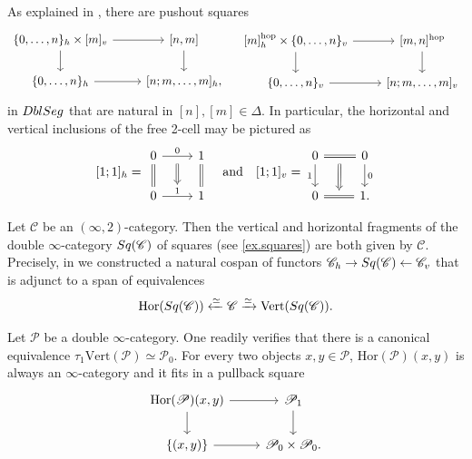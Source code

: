 \documentclass[a4paper, 11pt]{amsart}
\numberwithin{theorem}{section}
\theoremstyle{definition}
\newcommand{\cat}[1]{\textup{#1}}
\newcommand{\C}{\mathscr{C}}
\renewcommand{\P}{\mathscr{P}}
\renewcommand{\Vert}{\mathrm{Vert}}
\newcommand{\Hor}{\mathrm{Hor}}
\newcommand{\DblSeg}{\cat{DblSeg}}
\newcommand{\Sq}{\cat{Sq}}
\newcommand{\hop}{\mathrm{hop}}
\begin{document}
\begin{remark}\label{rem.h-v-inclusions}
	As explained in \cite[Section 3.2]{Comp}, there are pushout squares 
	\[
	\begin{tikzcd}
		\{0,\dotsc, n\}_h \times [m]_v \arrow[r]\arrow[d] & {[n,m]} \arrow[d] \\
		\{0, \dotsc, n\}_h  \arrow[r] & {[n;m,\dotsc,m]_h,}
	\end{tikzcd}
	\quad
	\begin{tikzcd}
		{ [m]_h^\hop} \times \{0,\dotsc, n\}_v \arrow[r]\arrow[d] & {[m,n]^\hop} \arrow[d] \\
		 \{0,\dotsc, n\}_v \arrow[r] & {[n;m,\dotsc,m]_v}
	\end{tikzcd}
	\]
	in $\DblSeg$ that are natural in $[n], [m] \in \Delta$. In particular, the horizontal and vertical inclusions of the free 2-cell 
	may be pictured as 
	\[
		[1;1]_h = \begin{tikzcd}
			0 \arrow[d,equal]\arrow[r, "0"name=f] & 1 \arrow[d,equal] \\
			0 \arrow[r, "1"name=t] & 1
			\arrow[from=f,to=t, Rightarrow, shorten <= 6pt]
		\end{tikzcd}
		\quad \text{and}\quad
		[1;1]_v = \begin{tikzcd}
			0 \arrow[r,equal, ""name=f]\arrow[d, "1"'] & 0 \arrow[d,"0"] \\
			0 \arrow[r, equal, ""name=t] & 1.
			\arrow[from=f,to=t,Rightarrow, shorten <= 6pt]
		\end{tikzcd}
	\]
\end{remark}

\begin{example}\label{ex.hor-vert-sq}
	Let $\C$ be an $(\infty,2)$-category. Then the vertical and horizontal fragments of the double $\infty$-category $\Sq(\C)$ 
	of squares (see \cref{ex.squares})
	are both given by $\C$. Precisely, in \cite[Construction 3.57]{Comp} we constructed a natural cospan 
	of functors $\C_h \to \Sq(\C) \leftarrow \C_v$ that is adjunct to a span of equivalences 
	$$\Hor(\Sq(\C)) \xleftarrow{\simeq} \C \xrightarrow{\simeq} \Vert(\Sq(\C)).$$
\end{example}

\begin{remark}\label{rem.vert-hor-dbl-infty-cat}
	Let $\P$ be a double $\infty$-category.
	One readily verifies that there is a canonical equivalence $\tau_1\Vert(\P) \simeq \P_0$. For every two objects $x,y \in \P$, $\Hor(\P)(x,y)$ is always an $\infty$-category 
	and it fits in a pullback square 
	\[
		\begin{tikzcd}
			\Hor(\P)(x,y) \arrow[r]\arrow[d] & \P_1 \arrow[d] \\
			\{(x,y)\} \arrow[r] & \P_0 \times \P_0.
		\end{tikzcd}
	\]
\end{remark}
\end{document}

